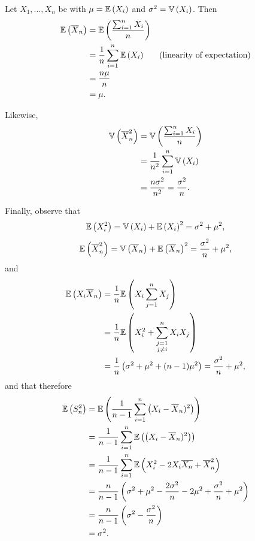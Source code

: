 \begin{ex}
  Let $X_1,\ldots,X_n$ be \iid with $\mu=\mathbb{E}\left(X_i\right)$ and $\sigma^2=\mathbb{V}\left(X_i\right)$. Then
  \begin{align*}
    \mathbb{E}\left(\overline{X}_n\right)
     & =\mathbb{E}\left(\frac{\sum_{i=1}^nX_i}{n}\right)                                      \\
     & =\frac{1}{n}\sum_{i=1}^n\mathbb{E}\left(X_i\right) & \text{(linearity of expectation)} \\
     & =\frac{n\mu}{n}                                                     \\
     & =\mu.
  \end{align*}

  Likewise,
  \begin{align*}
    \mathbb{V}\left(\overline{X}^2_n\right)
     & =\mathbb{V}\left(\frac{\sum_{i=1}^nX_i}{n}\right)           \\
     & =\frac{1}{n^2}\sum_{i=1}^n\mathbb{V}\left(X_i\right)        \\
     & =\frac{n\sigma^2}{n^2}=\frac{\sigma^2}{n}.
  \end{align*}

  Finally, observe that
  \[
    \mathbb{E}\left(X_i^2\right)
    =\mathbb{V}\left(X_i\right)+\mathbb{E}\left(X_i\right)^2
    =\sigma^2+\mu^2,
  \]
  \[
    \mathbb{E}\left(\overline{X}^2_n\right)
    =\mathbb{V}\left(\overline{X}_n\right)+\mathbb{E}\left(\overline{X}_n\right)^2
    =\frac{\sigma^2}{n}+\mu^2,
  \]
  and
  \begin{align*}
    \mathbb{E}\left(X_i\overline{X}_n\right)
     & =\frac{1}{n}\mathbb{E}\left(X_i\sum_{j=1}^nX_j\right)                                           \\
     & =\frac{1}{n}\mathbb{E}\left(X^2_i+\sum_{\substack{j=1                                     \\ j\neq i}}^n X_iX_j\right) \\
     & =\frac{1}{n}\left(\sigma^2+\mu^2+(n-1)\mu^2\right)=\frac{\sigma^2}{n}+\mu^2,
  \end{align*}
  and that therefore
  \begin{align*}
    \mathbb{E}\left(S^2_n\right)
     & =\mathbb{E}\left(\frac{1}{n-1}\sum_{i=1}^n\left(X_i-\overline{X}_n)^2\right)\right)                               \\
     & =\frac{1}{n-1}\sum_{i=1}^n\mathbb{E}\left(\left(X_i-\overline{X}_n)^2\right)\right)                               \\
     & =\frac{1}{n-1}\sum_{i=1}^n\mathbb{E}\left(X_i^2-2X_i\overline{X_n}+\overline{X}_n^2\right)                        \\
     & =\frac{n}{n-1}\left(\sigma^2+\mu^2-\frac{2\sigma^2}{n}-2\mu^2+\frac{\sigma^2}{n}+\mu^2 \right) \\
     & =\frac{n}{n-1}\left(\sigma^2-\frac{\sigma^2}{n}\right)                                         \\
     & =\sigma^2.
  \end{align*}
\end{ex}

